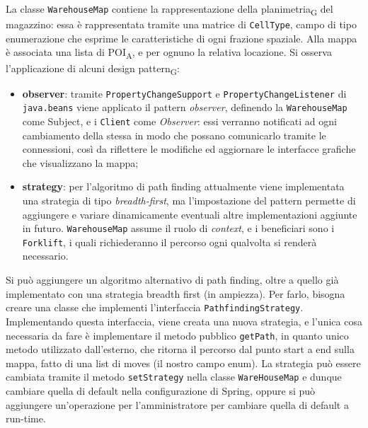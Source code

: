 La classe \texttt{WarehouseMap} contiene la rappresentazione della planimetria\textsubscript{G} del magazzino: essa è rappresentata tramite una matrice di \texttt{CellType}, campo di tipo enumerazione che esprime le caratteristiche di ogni frazione spaziale. Alla mappa è associata una lista di POI\textsubscript{A}, e per ognuno la relativa locazione.
Si osserva l'applicazione di alcuni design pattern\textsubscript{G}:
\begin{itemize}
	\item \textbf{observer}: tramite \texttt{PropertyChangeSupport} e \texttt{PropertyChangeListener} di \texttt{java.beans} viene applicato il pattern \textit{observer}, definendo la \texttt{WarehouseMap} come Subject, e i \texttt{Client} come \textit{Observer}: essi verranno notificati ad ogni cambiamento della stessa in modo che possano comunicarlo tramite le connessioni, così da riflettere le modifiche ed aggiornare le interfacce grafiche che visualizzano la mappa;
	\item \textbf{strategy}: per l’algoritmo di path finding attualmente viene implementata una strategia di tipo \textit{breadth-first}, ma l’impostazione del pattern permette di aggiungere e variare dinamicamente eventuali altre implementazioni aggiunte in futuro. \texttt{WarehouseMap} assume il ruolo di \textit{context}, e i beneficiari sono i \texttt{Forklift}, i quali richiederanno il percorso ogni qualvolta si renderà necessario.
\end{itemize}
Si può aggiungere un algoritmo alternativo di path finding, oltre a quello già implementato con una strategia breadth first (in ampiezza).
Per farlo, bisogna creare una classe che implementi l'interfaccia \texttt{PathfindingStrategy}. Implementando questa interfaccia, viene creata una nuova strategia, e l'unica cosa necessaria da fare è implementare il metodo pubblico \texttt{getPath}, in quanto unico metodo utilizzato dall'esterno, che ritorna il percorso dal punto start a end sulla mappa, fatto di una list di moves (il nostro campo enum).
La strategia può essere cambiata tramite il metodo \texttt{setStrategy} nella classe \texttt{WareHouseMap} e dunque cambiare quella di default nella configurazione di Spring, oppure si può aggiungere un'operazione per l'amministratore per cambiare quella di default a run-time.




\clearpage
{}
\label{collision-details}

